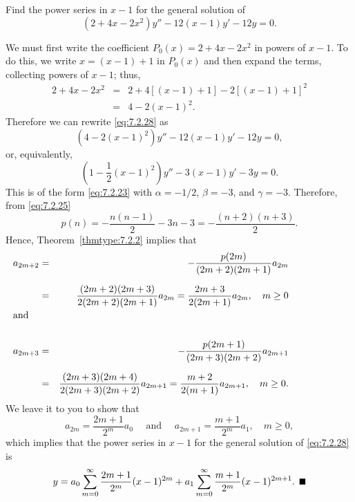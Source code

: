 \begin{example}
  \label{example:7.2.3}\rm Find the power series in $x-1$ for the general solution of
  \begin{equation}
    \label{eq:7.2.28}(2+4x-2x^{2})y''-12(x-1)y'-12y=0.
  \end{equation}
\end{example}

\begin{examplesolution}
\solution We must first write the coefficient $P_{0}(x)=2+4x-2x^{2}$ in powers of $x-1$. To do this,
we write $x=(x-1)+1$ in $P_{0}(x)$ and then expand the terms, collecting powers of $x-1$; thus,
\begin{eqnarray*}
  2+4x-2x^{2} & = & 2+4[(x-1)+1]-2[(x-1)+1]^{2} \\
              & = & 4-2(x-1)^{2}.
\end{eqnarray*}
Therefore we can rewrite \eqref{eq:7.2.28} as
\[
  \left(4-2(x-1)^{2}\right)y''-12(x-1)y'-12y=0,
\]
or, equivalently,
\[
  \left(1-\frac{1}{2}(x-1)^{2}\right)y''-3(x-1)y'-3y=0.
\]
This is of the form \eqref{eq:7.2.23} with $\alpha=-1/2$, $\beta=-3$, and $\gamma=-3$. Therefore,
from \eqref{eq:7.2.25}
\[
  p(n)=-\frac{n(n-1)}{2}-3n-3=-\frac{(n+2)(n+3)}{2}.
\]
Hence, Theorem~\ref{thmtype:7.2.2} implies that
\begin{eqnarray*}
  a_{2m+2}                            & = & -\frac{p(2m)}{(2m+2)(2m+1)}a_{2m}                                               \\[2\jot]
                                      & = & \frac{(2m+2)(2m+3)}{2(2m+2)(2m+1)}a_{2m}=\frac{2m+3}{2(2m+1)}a_{2m},\quad m\ge0 \\
  \noalign{\hspace*{-15pt}\mbox{and}}                                                                                       \\
  a_{2m+3}                            & = & -\frac{p(2m+1)}{(2m+3)(2m+2)}a_{2m+1}                                           \\[2\jot]
                                      & = & \frac{(2m+3)(2m+4)}{2(2m+3)(2m+2)}a_{2m+1}=\frac{m+2}{2(m+1)}a_{2m+1},\quad m\ge0.
\end{eqnarray*}
We leave it to you to show that
\[
  a_{2m}=\frac{2m+1}{2^{m}}a_{0}\quad\mbox{ and }\quad a_{2m+1}=\frac{m+1}{2^{m}}a_{1},\quad m\ge0,
\]
which implies that the power series in $x-1$ for the general solution of \eqref{eq:7.2.28} is
\[
  y=a_{0}\sum_{m=0}^{\infty}\frac{2m+1}{2^{m}}(x-1)^{2m}+a_{1}\sum_{m=0}^{\infty}\frac{m+1}{2^{m}}(x-1)^{2m+1}.\bbox
\]
\end{examplesolution}

